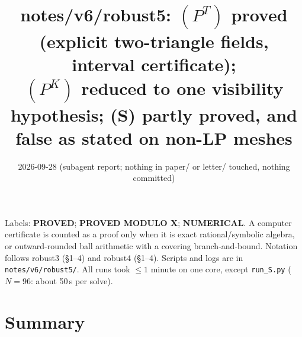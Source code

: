 \documentclass[11pt]{article}
\title{notes/v6/robust5: $(P^T)$ proved (explicit two-triangle fields, interval certificate);\\
$(P^K)$ reduced to one visibility hypothesis; (S) partly proved, and false as stated on non-LP meshes}
\date{2026-09-28 (subagent report; nothing in paper/ or letter/ touched, nothing committed)}
\theoremstyle{remark}
\begin{document}
\maketitle

\noindent Labels: \textbf{PROVED}; \textbf{PROVED MODULO X}; \textbf{NUMERICAL}. A computer certificate is counted as a
proof only when it is exact rational/symbolic algebra, or outward-rounded ball arithmetic with a covering
branch-and-bound. Notation follows robust3 (\S1--4) and robust4 (\S1--4). Scripts and logs are in
\texttt{notes/v6/robust5/}. All runs took $\le1$ minute on one core, except \texttt{run\_S.py} ($N=96$: about 50\,s per solve).

\section*{Summary}
\end{document}
